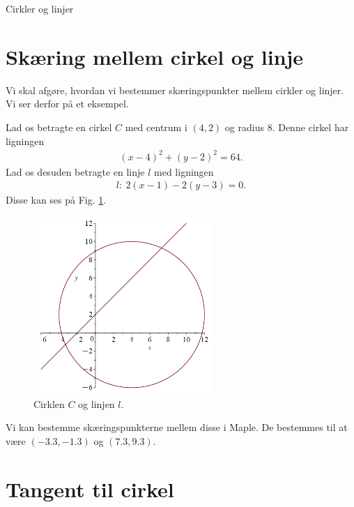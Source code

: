 \begin{center}
\Huge
Cirkler og linjer
\end{center}

\section*{Skæring mellem cirkel og linje}
Vi skal afgøre, hvordan vi bestemmer skæringspunkter mellem cirkler og linjer. Vi ser derfor på et eksempel.
\begin{exa}
	Lad os betragte en cirkel $C$ med centrum i $(4,2)$ og radius 8. Denne 
	cirkel har ligningen 
	\begin{align*}
		(x-4)^2 + (y-2)^2 = 64.
	\end{align*}
	Lad os desuden betragte en linje $l$ med ligningen
	\begin{align*}
		l: \ 2(x-1) -2(y-3) = 0. 
	\end{align*}
	Disse kan ses på Fig. \ref{fig:cirkellinje}.
	\begin{figure}[H]
		\centering
		\includegraphics[width=0.6\textwidth]{Billeder/cirkellinje.png}
		\caption{Cirklen $C$ og linjen $l$.}
		\label{fig:cirkellinje}
	\end{figure}
	Vi kan bestemme skæringspunkterne mellem disse i Maple. De bestemmes til at være $(-3.3, -1.3)$ og $(7.3,9.3)$. 
\end{exa}

\section*{Tangent til cirkel}

